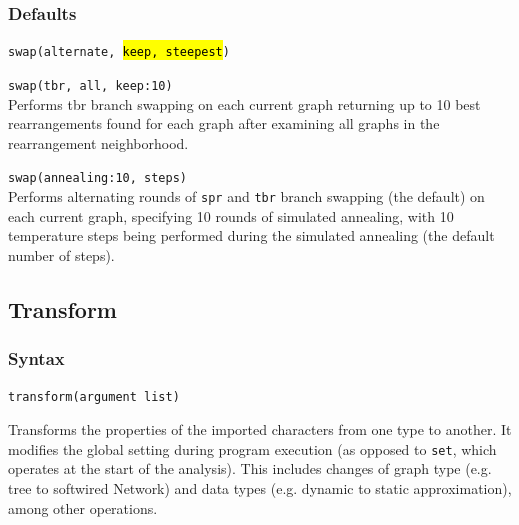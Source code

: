 		\subsubsection{Defaults}
			\texttt{swap(alternate, \hl{keep, steepest})}
		
		\begin{example}
			\item{\texttt{swap(tbr, all, keep:10)}\\Performs tbr branch swapping on each current graph 
			returning up to 10 best rearrangements found for each graph after examining all graphs in 
			the rearrangement neighborhood.}
			
			\item{\texttt{swap(annealing:10, steps)}\\Performs alternating rounds of \texttt{spr} and 
			\texttt{tbr} branch swapping (the default) on each current graph, specifying 10 rounds of
			simulated annealing, with 10 temperature steps being performed during the
			simulated annealing (the default number of steps).}
		\end{example}
	
\subsection{Transform}
\label{subsec:transform}
	\subsubsection{Syntax}
		\texttt{transform(argument list)}
			
	\begin{phygdescription}
		{Transforms the properties of the imported characters from one type to another. It 
		modifies the global setting during program execution (as opposed to \texttt{set}, 
		which operates at the start of the analysis). This includes changes of graph type
		(e.g. tree to softwired Network) and data types (e.g. dynamic to static 
		approximation), among other operations.}
	\end{phygdescription}
			
